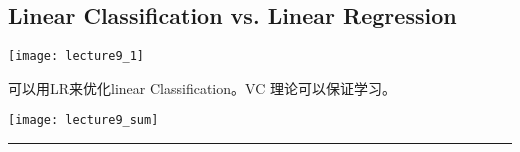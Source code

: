 \subsection{Linear Classification vs. Linear Regression}
\begin{center}
\texttt{[image: lecture9\_1]}\\
\end{center}
可以用LR来优化linear Classification。VC 理论可以保证学习。 \par
\begin{center}
\texttt{[image: lecture9\_sum]}\\
\end{center}

\noindent
{\color{RubineRed} \rule{\linewidth}{1mm} }